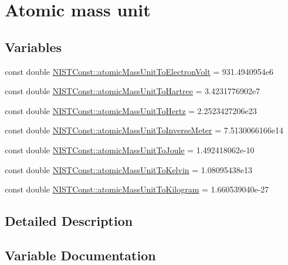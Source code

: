 \hypertarget{group___atomic_mass_unit}{}\section{Atomic mass unit}
\label{group___atomic_mass_unit}
\subsection*{Variables}
\begin{DoxyCompactItemize}
\item 
const double \hyperlink{group___atomic_mass_unit_ga4a5d912289e6a828a25e9e7ae3385b0d}{N\+I\+S\+T\+Const\+::atomic\+Mass\+Unit\+To\+Electron\+Volt} = 931.\+4940954e6
\item 
const double \hyperlink{group___atomic_mass_unit_ga8a6b352e1a13d0cbbc0f36f650e2c682}{N\+I\+S\+T\+Const\+::atomic\+Mass\+Unit\+To\+Hartree} = 3.\+4231776902e7
\item 
const double \hyperlink{group___atomic_mass_unit_gad284f1982f0182e1e4a90e0bff793af9}{N\+I\+S\+T\+Const\+::atomic\+Mass\+Unit\+To\+Hertz} = 2.\+2523427206e23
\item 
const double \hyperlink{group___atomic_mass_unit_gae1f5517810a5df9365d26887c04ada40}{N\+I\+S\+T\+Const\+::atomic\+Mass\+Unit\+To\+Inverse\+Meter} = 7.\+5130066166e14
\item 
const double \hyperlink{group___atomic_mass_unit_gaea7c1916a35df8824ac6a67be3f65f33}{N\+I\+S\+T\+Const\+::atomic\+Mass\+Unit\+To\+Joule} = 1.\+492418062e-\/10
\item 
const double \hyperlink{group___atomic_mass_unit_gaf9c3a2dfd69d4e74cee3361abd7d7ecf}{N\+I\+S\+T\+Const\+::atomic\+Mass\+Unit\+To\+Kelvin} = 1.\+08095438e13
\item 
const double \hyperlink{group___atomic_mass_unit_gafdd40d93803d15e1ff887dc12c49ca99}{N\+I\+S\+T\+Const\+::atomic\+Mass\+Unit\+To\+Kilogram} = 1.\+660539040e-\/27
\end{DoxyCompactItemize}


\subsection{Detailed Description}


\subsection{Variable Documentation}
\mbox{\label{group___atomic_mass_unit_ga4a5d912289e6a828a25e9e7ae3385b0d}} 
